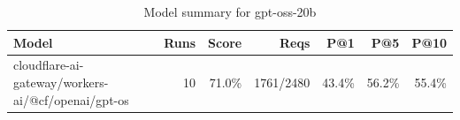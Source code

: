 \begin{table}[htbp]
\centering
\begin{tabular}{lrrrrrr}
\toprule
Model & Runs & Score & Reqs & P@1 & P@5 & P@10 \\
\midrule
cloudflare-ai-gateway/workers-ai/@cf/openai/gpt-os & 10 & 71.0\% & 1761/2480 & 43.4\% & 56.2\% & 55.4\% \\
\bottomrule
\end{tabular}
\caption{Model summary for gpt-oss-20b}
\end{table}
